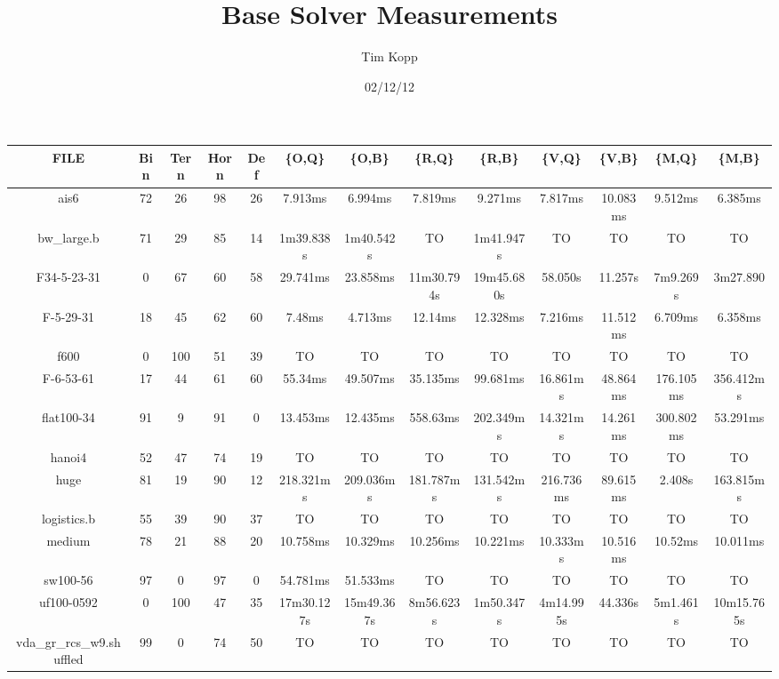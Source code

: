 \documentclass{article}
\title{Base Solver Measurements}
\author{Tim Kopp}
\date{02/12/12}
\begin{document}
\maketitle

\begin{table}[ht!]
\centering
\begin{tabular}{|c||c|c|c|c||c|c|c|c|c|c|c|c|}\hline
FILE & Bin & Tern & Horn & Def & \{O,Q\} & \{O,B\} & \{R,Q\} & \{R,B\} & \{V,Q\} & \{V,B\} & \{M,Q\} & \{M,B\} \\\hline\hline
ais6 & 72 & 26 & 98 & 26 & 7.913ms & 6.994ms & 7.819ms & 9.271ms & 7.817ms & 10.083ms & 9.512ms & 6.385ms \\\hline
bw\_large.b & 71 & 29 & 85 & 14 & 1m39.838s & 1m40.542s & TO & 1m41.947s & TO & TO & TO & TO \\\hline
F34-5-23-31 & 0 & 67 & 60 & 58 & 29.741ms & 23.858ms & 11m30.794s & 19m45.680s & 58.050s & 11.257s & 7m9.269s & 3m27.890 \\\hline
F-5-29-31 & 18 & 45 & 62 & 60 & 7.48ms & 4.713ms & 12.14ms & 12.328ms & 7.216ms & 11.512ms & 6.709ms & 6.358ms \\\hline
f600 & 0 & 100 & 51 & 39 & TO & TO & TO & TO & TO & TO & TO & TO \\\hline
F-6-53-61 & 17 & 44 & 61 & 60 & 55.34ms & 49.507ms & 35.135ms & 99.681ms & 16.861ms & 48.864ms & 176.105ms & 356.412ms \\\hline
flat100-34 & 91 & 9 & 91 & 0 & 13.453ms & 12.435ms & 558.63ms & 202.349ms & 14.321ms & 14.261ms & 300.802ms & 53.291ms \\\hline
hanoi4 & 52 & 47 & 74 & 19 & TO & TO & TO & TO & TO & TO & TO & TO \\\hline
huge & 81 & 19 & 90 & 12 & 218.321ms & 209.036ms & 181.787ms & 131.542ms & 216.736ms & 89.615ms & 2.408s & 163.815ms \\\hline
logistics.b & 55 & 39 & 90 & 37 & TO & TO & TO & TO & TO & TO & TO & TO \\\hline
medium & 78 & 21 & 88 & 20 & 10.758ms & 10.329ms & 10.256ms & 10.221ms & 10.333ms & 10.516ms & 10.52ms & 10.011ms \\\hline
sw100-56 & 97 & 0 & 97 & 0 & 54.781ms & 51.533ms & TO & TO & TO & TO & TO & TO \\\hline
uf100-0592 & 0 & 100 & 47 & 35 & 17m30.127s & 15m49.367s & 8m56.623s & 1m50.347s & 4m14.995s & 44.336s & 5m1.461s & 10m15.765s \\\hline
vda\_gr\_rcs\_w9.shuffled & 99 & 0 & 74 & 50 & TO & TO & TO & TO & TO & TO & TO & TO \\\hline
\end{tabular}
\end{table}
\end{document}
